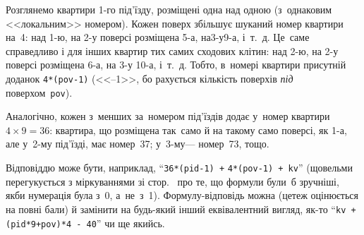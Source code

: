 \Tutorial	Розглянемо квартири \mbox{1-го} під'їзду, 
розміщені одна над одною (з~однаковим <<локальним>> номером). 
Кожен поверх збільшує шуканий номер квартири на~4:
над \mbox{1-ю}, на \mbox{2-у} поверсі розміщена \mbox{5-а}, 
на\nolinebreak[3] \mbox{3-у}\nolinebreak[3] \mbox{9-а}, і~т.~д. 
Це~саме справедливо і для інших квартир 
тих самих сходових клітин: над \mbox{2-ю}, на \mbox{2-у} поверсі розміщена \mbox{6-а}, 
на \mbox{3-у} \mbox{10-а}, і~т.~д. 
Тобто, в~номері квартири присутній доданок \verb"4*(pov-1)" 
(<<--1>>, бо рахується кількість поверхів 
\emph{під} поверхом~\texttt{pov}).

Аналогічно, кожен з~менших за~номером під'їздів додає у~номер квартири ${4{\times}9{=}36}$:
квартира, що розміщена так~само й на такому само поверсі, як \mbox{1-а}, 
але у~\mbox{2-му} під'їзді, має номер~37; у~\mbox{3-му}\nolinebreak[3] --- номер~73, тощо.

Відповіддю може бути, наприклад,\hspace{0.25em plus 1mm}  
``\verb"36*(pid-1) +"\nolinebreak[2]\hspace{0.25pt plus 1pt} \verb"4*(pov-1) + kv"''\hspace{0.25em plus 1mm}
(що\nolinebreak[3] вельми перегукується з міркуваннями зі стор.~\pageref{text:about-good-formulae-for-0-based-numbering} про те, що формули були~б зручніші, якби нумерація була з~0, а~не~з~1).
Фор\-мулу-від\-по\-відь можна (це\nolinebreak[3] теж оцінюється на повні бали) й замінити на будь-який інший еквівалентний вигляд, 
як-то\hspace{0.25em plus 1mm}
``\verb"kv +"\nolinebreak[2]\hspace{0.25pt plus 1pt} \verb"(pid*9+pov)*4 - 40"'' чи ще якийсь.
